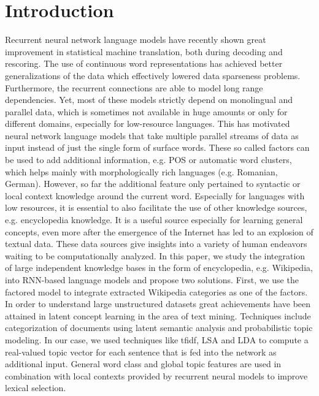 \documentclass[a4paper]{article}
\begin{document}
\section{Introduction}
Recurrent neural network language models have recently shown great improvement in statistical machine translation, both during decoding and rescoring. The use of continuous word representations has achieved better generalizations of the data which effectively lowered data sparseness problems. Furthermore, the recurrent connections are able to model long range dependencies. Yet, most of these models strictly depend on monolingual and parallel data, which is sometimes not available in huge amounts or only for different domains, especially for low-resource languages.
This has motivated neural network language models that take multiple parallel streams of data as input instead of just the single form of surface words. These so called factors can be used to add additional information, e.g. POS or automatic word clusters, which helps mainly with morphologically rich languages (e.g. Romanian, German). However, so far the additional feature only pertained to syntactic or local context knowledge around the current word. Especially for languages with low resources, it is essential to also facilitate the use of other knowledge sources, e.g. encyclopedia knowledge. It is a useful source especially for learning general concepts, even more after the emergence of the Internet has led to an explosion of textual data. These data sources give insights into a variety of human endeavors waiting to be computationally analyzed.
In this paper, we study the integration of large independent knowledge bases in the form of encyclopedia, e.g. Wikipedia, into RNN-based language models and propose two solutions. 
First, we use  the factored model to integrate extracted Wikipedia categories as one of the factors. In order to understand large unstructured datasets great achievements have been attained in latent concept learning in the area of text mining. Techniques include categorization of documents using latent semantic analysis and probabilistic topic modeling. In our case, we used techniques like tfidf, LSA and LDA to compute a real-valued topic vector for each sentence that is fed into the network as additional input. 
General word class and global topic features are used in combination with local contexts provided by recurrent neural models to improve lexical selection. 
\end{document}
